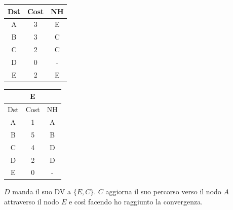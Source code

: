 \documentclass[10pt]{article}
\begin{document}
\begin{table}[h!]
\begin{tabular}{|c||c||c|}
					Dst & Cost & NH\\
					\hline
					A & 3 & E \\
					B & 3 & C \\
					C & 2 & C \\
					D & 0 & - \\
					E & 2 & E \\
					\hline
				\end{tabular}
				\begin{tabular}{|c||c||c|}
					\hline
					\multicolumn{3}{|c|}{E} \\
					\hline
					Dst & Cost & NH \\
					\hline
					A & 1 & A \\
					B & 5 & B \\
					C & 4 & D \\
					D & 2 & D \\
					E & 0 & - \\
					\hline
				\end{tabular}
			\end{table}
			\newline \newline
			$D$ manda il suo DV a $\{E,C\}$.
			\newline
			$C$ aggiorna il suo percorso verso il nodo $A$ attraverso il nodo $E$ e così facendo ho raggiunto la convergenza.
\end{document}
